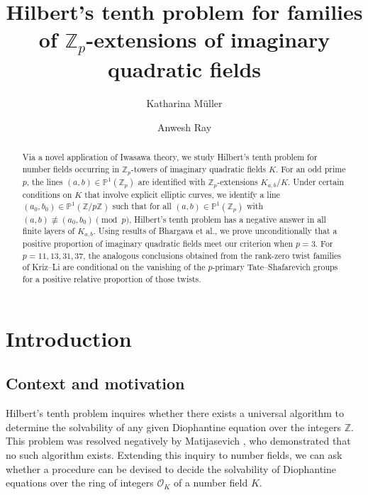 \documentclass[12pt]{amsart}
\newcommand{\Z}{\mathbb{Z}}
\newcommand{\cO}{\mathcal{O}}
\numberwithin{equation}{section}
\begin{document}
\title[Hilbert's tenth problem for $\mathbb{Z}_p$-extensions]{Hilbert's tenth problem for families of $ \mathbb{Z}_p $-extensions of imaginary quadratic fields}
\author[K.~M\"uller]{Katharina M\"uller}
\address[Müller]{Institut für Theoretische Informatik, Mathematik und Operations Research, Universität der Bundeswehr München, Werner-Heisenberg-Weg 39, 85577 Neubiberg, Germany}


\author[A.~Ray]{Anwesh Ray}
\address[Ray]{Chennai Mathematical Institute, H1, SIPCOT IT Park, Kelambakkam, Siruseri, Tamil Nadu 603103, India}




\maketitle

\begin{abstract}
Via a novel application of Iwasawa theory, we study Hilbert's tenth problem for number fields occurring in $\Z_p$-towers of imaginary quadratic fields $K$. For an odd prime $p$, the lines $(a,b) \in \mathbb{P}^1(\mathbb{Z}_p)$ are identified with $\mathbb{Z}_p$-extensions $K_{a,b}/K$. Under certain conditions on $K$ that involve explicit elliptic curves, we identify a line $(a_0,b_0) \in \mathbb{P}^1(\Z/p\Z)$ such that for all $(a,b) \in \mathbb{P}^1(\mathbb{Z}_p)$ with $(a,b)\not\equiv(a_0,b_0)\pmod p$, Hilbert's tenth problem has a negative answer in all finite layers of $K_{a,b}$. Using results of Bhargava et al., we prove unconditionally that a positive proportion of imaginary quadratic fields meet our criterion when $p=3$. For $p=11,13,31,37$, the analogous conclusions obtained from the rank-zero twist families of Kriz--Li are conditional on the vanishing of the $p$-primary Tate--Shafarevich groups for a positive relative proportion of those twists.
\end{abstract}

\section{Introduction}
\subsection{Context and motivation} Hilbert's tenth problem inquires whether there exists a universal algorithm to determine the solvability of any given Diophantine equation over the integers $\mathbb{Z}$. This problem was resolved negatively by Matijasevich \cite{matiyasevich}, who demonstrated that no such algorithm exists. Extending this inquiry to number fields, we can ask whether a procedure can be devised to decide the solvability of Diophantine equations over the ring of integers $\cO_K$ of a number field $K$.
\end{document}
